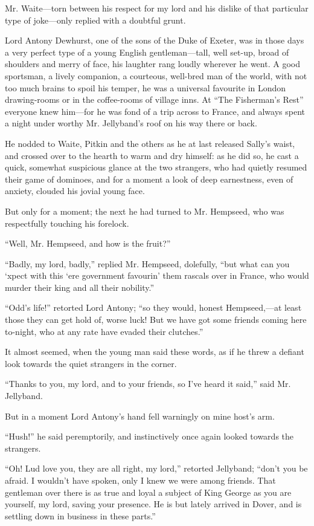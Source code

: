 \documentclass[paper=a5,BCOR=7mm,twoside,DIV=calc,12pt,usegeometry,chapterprefix,endperiod,headings=big]{scrbook}
\begin{document}
Mr. Waite---torn between his respect for my lord and his dislike of that particular type of joke---only replied with a doubtful grunt.

Lord Antony Dewhurst, one of the sons of the Duke of Exeter, was in those days a very perfect type of a young English gentleman---tall, well set-up, broad of shoulders and merry of face, his laughter rang loudly wherever he went. A good sportsman, a lively companion, a courteous, well-bred man of the world, with not too much brains to spoil his temper, he was a universal favourite in London drawing-rooms or in the coffee-rooms of village inns. At \enquote{The Fisherman's Rest} everyone knew him---for he was fond of a trip across to France, and always spent a night under worthy Mr. Jellyband's roof on his way there or back.

He nodded to Waite, Pitkin and the others as he at last released Sally's waist, and crossed over to the hearth to warm and dry himself: as he did so, he cast a quick, somewhat suspicious glance at the two strangers, who had quietly resumed their game of dominoes, and for a moment a look of deep earnestness, even of anxiety, clouded his jovial young face.

But only for a moment; the next he had turned to Mr. Hempseed, who was respectfully touching his forelock.

\enquote{Well, Mr. Hempseed, and how is the fruit?}

\enquote{Badly, my lord, badly,} replied Mr. Hempseed, dolefully, \enquote{but what can you `xpect with this `ere government favourin’ them rascals over in France, who would murder their king and all their nobility.}

\enquote{Odd's life!} retorted Lord Antony; \enquote{so they would, honest Hempseed,---at least those they can get hold of, worse luck! But we have got some friends coming here to-night, who at any rate have evaded their clutches.}

It almost seemed, when the young man said these words, as if he threw a defiant look towards the quiet strangers in the corner.

\enquote{Thanks to you, my lord, and to your friends, so I've heard it said,} said Mr. Jellyband.

But in a moment Lord Antony's hand fell warningly on mine host's arm.

\enquote{Hush!} he said peremptorily, and instinctively once again looked towards the strangers.

\enquote{Oh! Lud love you, they are all right, my lord,} retorted Jellyband; \enquote{don't you be afraid. I wouldn't have spoken, only I knew we were among friends. That gentleman over there is as true and loyal a subject of King George as you are yourself, my lord, saving your presence. He is but lately arrived in Dover, and is settling down in business in these parts.}
\end{document}
